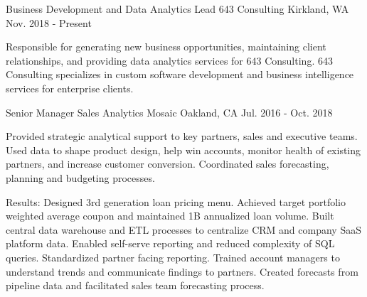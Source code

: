 


\begin{cventries}

\cventry
{Business Development and Data Analytics Lead} %
{643 Consulting} %
{Kirkland, WA} %
{Nov. 2018 - Present} %
{ %
\begin{cvitems}
\item {Responsible for generating new business opportunities, maintaining client relationships, and providing data analytics services for 643 Consulting. 643 Consulting specializes in custom software development and business intelligence services for enterprise clients.}
\end{cvitems}
}
	
\cventry
{Senior Manager Sales Analytics} %
{Mosaic} %
{Oakland, CA} %
{Jul. 2016 - Oct. 2018} %
{ %
\begin{cvitems}
\item {Provided strategic analytical support to key partners, sales and executive teams. Used data to shape product design, help win accounts, monitor health of existing partners, and increase customer conversion. Coordinated sales forecasting, planning and budgeting processes.}
\end{cvitems}
}
\begin{cvitemsnb}
\item {Results: Designed 3rd generation loan pricing menu. Achieved target portfolio weighted average coupon and maintained 1B annualized loan volume. Built central data warehouse and ETL processes to centralize CRM and company SaaS platform data. Enabled self-serve reporting and reduced complexity of SQL queries. Standardized partner facing reporting. Trained account managers to understand trends and communicate findings to partners. Created forecasts from pipeline data and facilitated sales team forecasting process.}
\end{cvitemsnb}
	

\end{cventries}
